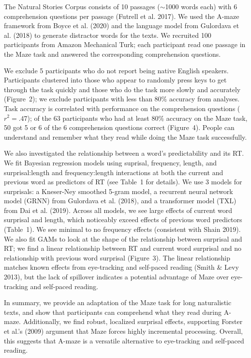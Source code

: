 \documentclass[11pt,a4paper]{article}
\begin{document}
The Natural Stories Corpus consists of 10 passages ($\sim$1000 words each) with 6 comprehension questions per passage (Futrell et al. 2017). We used the A-maze framework from Boyce et al. (2020) and the language model from Gulordava et al. (2018) to generate distractor words for the texts. We recruited 100 participants from Amazon Mechanical Turk; each participant read one passage in the Maze task and answered the corresponding comprehension questions. 

We exclude 5 participants who do not report being native English speakers. Participants clustered into those who appear to randomly press keys to get through the task quickly and those who do the task more slowly and accurately (Figure~2); we exclude participants with less than 80\% accuracy from analyses. Task accuracy is correlated with performance on the comprehension questions ($r^2=.47$); of the 63 participants who had at least 80\% accuracy on the Maze task, 50 got 5 or 6 of the 6 comprehension questions correct (Figure~4). People can understand and remember what they read while doing the Maze task successfully.

We also investigated the relationship between a word's predictability and its RT. We fit Bayesian regression models using suprisal, frequency, length, and surprisal:length and frequency:length interactions at both the current and previous word as predictors of RT (see Table~1 for details). We use 3 models for surprisals: a Kneser-Ney smoothed 5-gram model, a recurrent neural network model (GRNN) from Gulordava et al. (2018), and a transformer model (TXL) from Dai et al. (2019). Across all models, we see large effects of current word surprisal and length, which noticeably exceed effects of previous word predictors (Table~1). We see minimal to no frequency effects (consistent with Shain 2019). We also fit GAMs to look at the shape of the relationship between surprisal and RT; we find a linear relationship between RT and current word surprisal and no relationship with previous word surprisal (Figure~3). The linear relationship matches known effects from eye-tracking and self-paced reading (Smith \& Levy 2013), but the lack of spillover indicates a potential advantage of Maze over eye-tracking and self-paced reading.


In summary, we provide an adaptation of the Maze task for long naturalistic texts, and show that participants can comprehend what they read during A-maze. Additionally, we find robust, localized surprisal effects, supporting Forster et al.'s (2009) argument that Maze forces highly incremental processing. Overall, this suggests that A-maze is a versatile alternative to eye-tracking and self-paced reading. 
\end{document}
